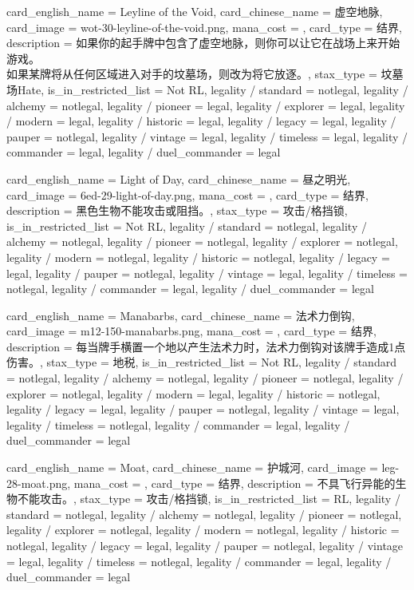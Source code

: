 \documentclass[lang = cn, color = black, 10pt]{AllThatStax}
\begin{document}
\card
{
	card_english_name = {Leyline of the Void},
	card_chinese_name = {虚空地脉},
	card_image = wot-30-leyline-of-the-void.png,
	mana_cost = ,
	card_type = 结界,
	description = {如果你的起手牌中包含了虚空地脉，则你可以让它在战场上来开始游戏。\\
如果某牌将从任何区域进入对手的坟墓场，则改为将它放逐。},
	stax_type = 坟墓场Hate,
	is_in_restricted_list = Not RL,
	legality / standard = notlegal,
	legality / alchemy = notlegal,
	legality / pioneer = legal,
	legality / explorer = legal,
	legality / modern = legal,
	legality / historic = legal,
	legality / legacy = legal,
	legality / pauper = notlegal,
	legality / vintage = legal,
	legality / timeless = legal,
	legality / commander = legal,
	legality / duel_commander = legal
}

\card
{
	card_english_name = {Light of Day},
	card_chinese_name = {昼之明光},
	card_image = 6ed-29-light-of-day.png,
	mana_cost = ,
	card_type = 结界,
	description = {黑色生物不能攻击或阻挡。},
	stax_type = 攻击/格挡锁,
	is_in_restricted_list = Not RL,
	legality / standard = notlegal,
	legality / alchemy = notlegal,
	legality / pioneer = notlegal,
	legality / explorer = notlegal,
	legality / modern = notlegal,
	legality / historic = notlegal,
	legality / legacy = legal,
	legality / pauper = notlegal,
	legality / vintage = legal,
	legality / timeless = notlegal,
	legality / commander = legal,
	legality / duel_commander = legal
}

\card
{
	card_english_name = {Manabarbs},
	card_chinese_name = {法术力倒钩},
	card_image = m12-150-manabarbs.png,
	mana_cost = ,
	card_type = 结界,
	description = {每当牌手横置一个地以产生法术力时，法术力倒钩对该牌手造成1点伤害。},
	stax_type = 地税,
	is_in_restricted_list = Not RL,
	legality / standard = notlegal,
	legality / alchemy = notlegal,
	legality / pioneer = notlegal,
	legality / explorer = notlegal,
	legality / modern = legal,
	legality / historic = notlegal,
	legality / legacy = legal,
	legality / pauper = notlegal,
	legality / vintage = legal,
	legality / timeless = notlegal,
	legality / commander = legal,
	legality / duel_commander = legal
}

\card
{
	card_english_name = {Moat},
	card_chinese_name = {护城河},
	card_image = leg-28-moat.png,
	mana_cost = ,
	card_type = 结界,
	description = {不具飞行异能的生物不能攻击。},
	stax_type = 攻击/格挡锁,
	is_in_restricted_list = RL,
	legality / standard = notlegal,
	legality / alchemy = notlegal,
	legality / pioneer = notlegal,
	legality / explorer = notlegal,
	legality / modern = notlegal,
	legality / historic = notlegal,
	legality / legacy = legal,
	legality / pauper = notlegal,
	legality / vintage = legal,
	legality / timeless = notlegal,
	legality / commander = legal,
	legality / duel_commander = legal
}
\end{document}
